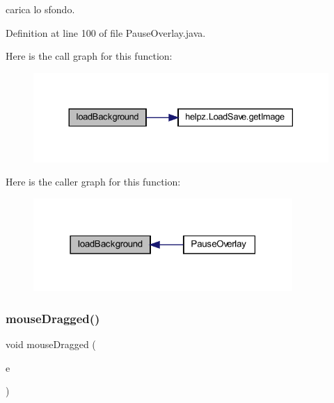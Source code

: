 carica lo sfondo. 



Definition at line 100 of file Pause\+Overlay.\+java.

Here is the call graph for this function\+:
\nopagebreak
\begin{figure}[H]
\begin{center}
\leavevmode
\includegraphics[width=330pt]{classui_1_1_pause_overlay_ab9e42b0ec1e9c9ffdf1edd5dec1b0ddd_cgraph}
\end{center}
\end{figure}
Here is the caller graph for this function\+:\nopagebreak
\begin{figure}[H]
\begin{center}
\leavevmode
\includegraphics[width=279pt]{classui_1_1_pause_overlay_ab9e42b0ec1e9c9ffdf1edd5dec1b0ddd_icgraph}
\end{center}
\end{figure}
\mbox{\label{classui_1_1_pause_overlay_adbfc0588c017133c9b7070474402b72f}} 
\subsubsection{\texorpdfstring{mouse\+Dragged()}{mouseDragged()}}
{\footnotesize\ttfamily void mouse\+Dragged (\begin{DoxyParamCaption}\item[{Mouse\+Event}]{e }\end{DoxyParamCaption})}




